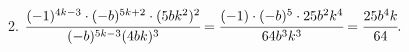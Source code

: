 2. $\cfrac{(-1)^{4k-3}\cdot(-b)^{5k+2}\cdot(5bk^2)^2}{(-b)^{5k-3}(4bk)^3}=
\cfrac{(-1)\cdot(-b)^{5}\cdot25b^2k^4}{64b^3k^3}=\cfrac{25b^4k}{64}.$\\
